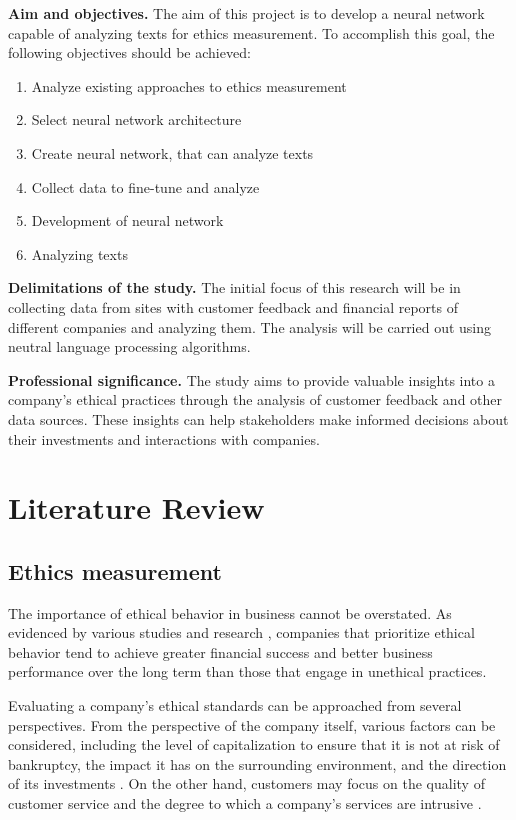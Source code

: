 \documentclass[PI]{ProjectProposal}
\begin{document}
\textbf{Aim and objectives.} The aim of this project is to develop a neural network capable of analyzing texts for ethics measurement. To accomplish this goal, the following objectives should be achieved:
\begin{enumerate}
\item Analyze existing approaches to ethics measurement
\item Select neural network architecture
\item Create neural network, that can analyze texts
\item Collect data to fine-tune and analyze
\item Development of neural network
\item Analyzing texts
\end{enumerate}

\textbf{Delimitations of the study.} The initial focus of this research will be in collecting data from sites with customer feedback and financial reports of different companies and analyzing them. The analysis will be carried out using neutral language processing algorithms.

\textbf{Professional significance.} The study aims to provide valuable insights into a company's ethical practices through the analysis of customer feedback and other data sources. These insights can help stakeholders make informed decisions about their investments and interactions with companies.
\chapter{Literature Review}
\label{sec:org57d24ed}
\section{Ethics measurement}
\label{sec:org67e239a}
The importance of ethical behavior in business cannot be overstated. As evidenced by various studies and research \autocites{climent_ethical_2018}[][]{mure_esg_2021}, companies that prioritize ethical behavior tend to achieve greater financial success and better business performance over the long term than those that engage in unethical practices.

Evaluating a company's ethical standards can be approached from several perspectives. From the perspective of the company itself, various factors can be considered, including the level of capitalization to ensure that it is not at risk of bankruptcy, the impact it has on the surrounding environment, and the direction of its investments \autocite{harvey1995ethical}. On the other hand, customers may focus on the quality of customer service \autocite{brunk2010exploring} and the degree to which a company's services are intrusive \autocite{mitchell1992bank}.
\end{document}
